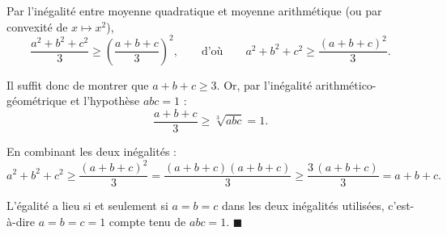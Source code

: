 Par l'inégalité entre moyenne quadratique et moyenne arithmétique
(ou par convexité de $x \mapsto x^2$),
\[
\frac{a^2 + b^2 + c^2}{3} \geqslant \left( \frac{a+b+c}{3} \right)^2,
\qquad\text{d'où}\qquad
a^2 + b^2 + c^2 \geqslant \frac{(a+b+c)^2}{3}.
\]

Il suffit donc de montrer que $a + b + c \geqslant 3$. Or, par
l'inégalité arithmético-géométrique et l'hypothèse $abc = 1$ :
\[
\frac{a+b+c}{3} \geqslant \sqrt[3]{abc} = 1.
\]

En combinant les deux inégalités :
\[
a^2 + b^2 + c^2 \geqslant \frac{(a+b+c)^2}{3} = \frac{(a+b+c)(a+b+c)}{3}
\geqslant \frac{3\,(a+b+c)}{3} = a + b + c.
\]

L'égalité a lieu si et seulement si $a = b = c$ dans les deux
inégalités utilisées, c'est-à-dire $a = b = c = 1$ compte tenu de
$abc = 1$. \hfill $\blacksquare$
